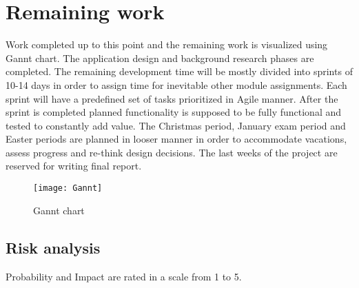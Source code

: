 

\section{Remaining work}

Work completed up to this point and the remaining work is visualized using Gannt chart. The application design and background research phases are completed. The remaining development time will be mostly divided into sprints of 10-14 days in order to assign time for inevitable other module assignments. Each sprint will have a predefined set of tasks prioritized in Agile manner. After the sprint is completed planned functionality is supposed to be fully functional and tested to constantly add value. The Christmas period, January exam period and Easter periods are planned in looser manner in order to accommodate vacations, assess progress and re-think design decisions. The last weeks of the project are reserved for writing final report.

\begin{figure}
\caption{Gannt chart}
\texttt{[image: Gannt]}
\centering
\end{figure}


\subsection{Risk analysis}
Probability and Impact are rated in a scale from 1 to 5.

\def\riska{Loss of source code at some stage of development}
\def \probabilitya {1}
\def \impacta {4}
\def \mitigationa {Use of remote source control  repository to frequently record every stage of the development, thus being able to recover it if needed. }

\def\riskaa{Unable to fulfill all of the requirements due to technical implemention difficulties}
\def \probabilityaa {3}
\def \impactaa {2}
\def \mitigationaa {During the start of development process requirements will be split into tasks, divided into sprints and ranked using Agile methodology, therefore ensuring that core functionality will be implemented first and a working proof of concept is available at the end of the project }

\def\riskaaa{Loss of development time due to other course modules}
\def \probabilityaaa {2}
\def \impactaaa {2}
\def \mitigationaaa {Dedicate fixed amount of time every week for the project in order to keep up with the schedule }


